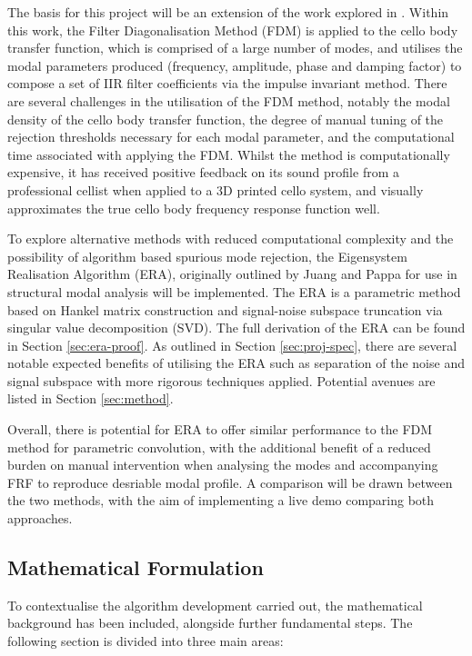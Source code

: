 The basis for this project will be an extension of the work explored in \cite{oneill}. Within this work, the Filter Diagonalisation Method (FDM) \cite{fdm} is applied to the cello body transfer function, which is comprised of a large number of modes, and utilises the modal parameters produced (frequency, amplitude, phase and damping factor) to compose a set of IIR filter coefficients via the impulse invariant method. There are several challenges in the utilisation of the FDM method, notably the modal density of the cello body transfer function, the degree of manual tuning of the rejection thresholds necessary for each modal parameter, and the computational time associated with applying the FDM. Whilst the method is computationally expensive, it has received positive feedback on its sound profile from a professional cellist when applied to a 3D printed cello system, and visually approximates the true cello body frequency response function well.

To explore alternative methods with reduced computational complexity and the possibility of algorithm based spurious mode rejection, the Eigensystem Realisation Algorithm (ERA), originally outlined by Juang and Pappa \cite{era,era-space} for use in structural modal analysis will be implemented. The ERA is a parametric method based on Hankel matrix construction and signal-noise subspace truncation via singular value decomposition (SVD).
The full derivation of the ERA can be found in Section \ref{sec:era-proof}. As outlined in Section \ref{sec:proj-spec}, there are several notable expected benefits of utilising the ERA such as separation of the noise and signal subspace with more rigorous techniques applied. Potential avenues are listed in Section \ref{sec:method}.

Overall, there is potential for ERA to offer similar performance to the FDM method for parametric convolution, with the additional benefit of a reduced burden on manual intervention when analysing the modes and accompanying FRF to reproduce desriable modal profile. A comparison will be drawn between the two methods, with the aim of implementing a live demo comparing both approaches.

\subsection{Mathematical Formulation}
\label{sec:maths}

To contextualise the algorithm development carried out, the mathematical background has been included, alongside further fundamental steps. The following section is divided into three main areas:

